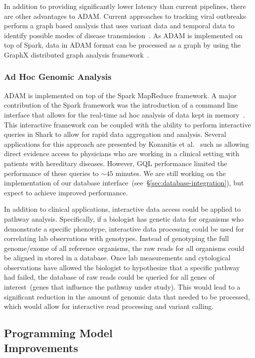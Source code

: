 \documentclass[10pt,twocolumn]{article}
\theoremstyle{plain}
\begin{document}
In addition to providing significantly lower latency than current pipelines, there are other advantages to ADAM. Current
approaches to tracking viral outbreaks perform a graph based analysis that uses variant data and temporal data to identify
possible modes of disease transmission~\cite{snitkin12}. As ADAM is implemented on top of Spark, data in ADAM format
can be processed as a graph by using the GraphX distributed graph analysis framework~\cite{xin13}.

\subsubsection{Ad Hoc Genomic Analysis}
\label{sec:ad-hoc-genomic-analysis}

ADAM is implemented on top of the Spark MapReduce framework. A major contribution of the Spark framework was the introduction
of a command line interface that allows for the real-time ad hoc analysis of data kept in memory~\cite{zaharia12}. This interactive
framework can be coupled with the ability to perform interactive queries in Shark to allow for rapid data aggregation and analysis.
Several applications for this approach are presented by Kozanitis et al.~\cite{kozanitis13} such as allowing direct evidence access
to physicians who are working in a clinical setting with patients with hereditary diseases. However, GQL performance limited the
performance of these queries to $\sim45$ minutes. We are still working on the implementation of our database
interface~(see~\S\ref{sec:database-integration}), but expect to achieve improved performance.

In addition to clinical applications, interactive data access could be applied to pathway analysis. Specifically, if a biologist has
genetic data for organisms who demonstrate a specific phenotype, interactive data processing could be used for correlating
lab observations with genotypes. Instead of genotyping the full genome/exome of all reference organisms, the raw reads for
all organisms could be aligned in stored in a database. Once lab measurements and cytological observations have allowed
the biologist to hypothesize that a specific pathway had failed, the database of raw reads could be queried for all genes of
interest~(genes that influence the pathway under study). This would lead to a significant reduction in the amount of genomic
data that needed to be processed, which would allow for interactive read processing and variant calling.

\subsection{Programming Model\\Improvements}
\label{sec:programming-model-improvements}
\end{document}

